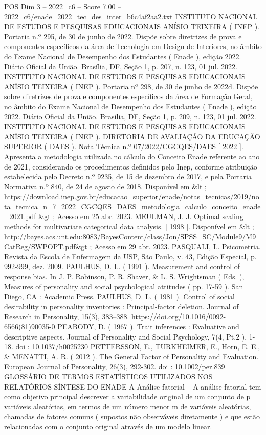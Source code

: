 \begin{textsample}{POS Dim 3 – 2022\_c6 – Score 7.00 – 2022\_c6/enade\_2022\_tec\_des\_inter\_b6c4af2aa2.txt}
INSTITUTO NACIONAL DE ESTUDOS E PESQUISAS EDUCACIONAIS ANÍSIO TEIXEIRA ( INEP ).
Portaria n.º 295, de 30 de junho de 2022.
Dispõe sobre diretrizes de prova e componentes específicos da área de Tecnologia em Design de Interiores, no âmbito do Exame Nacional de Desempenho dos Estudantes ( Enade ), edição 2022.
Diário Oficial da União.
Brasília, DF, Seção 1, p. 207, n. 123, 01 jul. 2022.
INSTITUTO NACIONAL DE ESTUDOS E PESQUISAS EDUCACIONAIS ANÍSIO TEIXEIRA ( INEP ).
Portaria nº 298, de 30 de junho de 2022d.
Dispõe sobre diretrizes de prova e componentes específicos da área de Formação Geral, no âmbito do Exame Nacional de Desempenho dos Estudantes ( Enade ), edição 2022.
Diário Oficial da União.
Brasília, DF, Seção 1, p. 209, n. 123, 01 jul. 2022.
INSTITUTO NACIONAL DE ESTUDOS E PESQUISAS EDUCACIONAIS ANÍSIO TEIXEIRA ( INEP ).
DIRETORIA DE AVALIAÇÃO DA EDUCAÇÃO SUPERIOR ( DAES ).
Nota Técnica n.º 07/2022/CGCQES/DAES [ 2022 ].
Apresenta a metodologia utilizada no cálculo do Conceito Enade referente ao ano de 2021, considerando os procedimentos definidos pelo Inep, conforme atribuição estabelecida pelo Decreto n.º 9235, de 15 de dezembro de 2017, e pela Portaria Normativa n.º 840, de 24 de agosto de 2018.
Disponível em \&lt ; https://download.inep.gov.br/educacao\_superior/enade/notas\_tecnicas/2019/nota\_tecnica\_n\_7\_2022\_CGCQES\_DAES\_metodologia\_calculo\_conceito\_enade\_2021.pdf \&gt ; Acesso em 25 abr. 2023.
MEULMAN, J.
J.
Optimal scaling methods for multivariate categorical data analysis. [ 1998 ].
Disponível em \&lt ; http://bayes.acs.unt.edu:8083/BayesContent/class/Jon/SPSS\_SC/Module9/M9\_CatReg/SWPOPT.pdf\&gt ; Acesso em 29 abr. 2023.
PASQUALI, L.
Psicometria.
Revista da Escola de Enfermagem da USP, São Paulo, v. 43, Edição Especial, p. 992-999, dez. 2009.
PAULHUS, D.
L. ( 1991 ).
Measurement and control of response bias.
In J.
P.
Robinson, P.
R.
Shaver, \& L.
S.
Wrightsman ( Eds. ), Measures of personality and social psychological attitudes ( pp. 17-59 ).
San Diego, CA : Academic Press.
PAULHUS, D.
L. ( 1981 ).
Control of social desirability in personality inventories : Principal-factor deletion.
Journal of Research in Personality, 15(3), 383–388. https://doi.org/10.1016/0092-6566(81)90035-0 PEABODY, D. ( 1967 ).
Trait inferences : Evaluative and descriptive aspects.
Journal of Personality and Social Psychology, 7(4, Pt.2 ), 1-18. doi : 10.1037/h0025230 PETTERSSON, E., TURKHEIMER, E., Horn, E.
E., \& MENATTI, A.
R. ( 2012 ).
The General Factor of Personality and Evaluation.
European Journal of Personality, 26(3), 292-302. doi : 10.1002/per.839 GLOSSÁRIO DE TERMOS ESTATÍSTICOS UTILIZADOS NOS RELATÓRIOS SÍNTESE DO ENADE A Análise fatorial – A análise fatorial tem como objetivo principal descrever a variabilidade original de um conjunto de p variáveis aleatórias, em termos de um número menor m de variáveis aleatórias, chamadas de fatores comuns ( supostos não observáveis diretamente ) e que estão relacionadas com o conjunto original através de um modelo linear.

\end{textsample}
